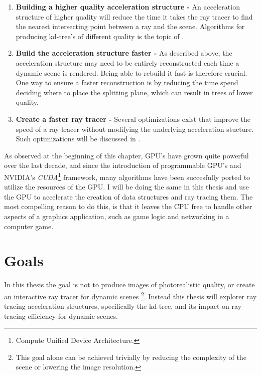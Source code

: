 \begin{enumerate}
  \item \textbf{Building a higher quality acceleration structure -} An
    acceleration structure of higher quality will reduce the time it takes the
    ray tracer to find the nearest intersecting point between a ray and the
    scene. Algorithms for producing kd-tree's of different quality is the topic
    of .
  \item \textbf{Build the acceleration structure faster -} As described above,
    the acceleration structure may need to be entirely reconstructed each time a
    dynamic scene is rendered. Being able to rebuild it fast is therefore
    crucial. One way to ensure a faster reconstruction is by reducing the time
    spend deciding where to place the splitting plane, which can result in trees
    of lower quality.
  \item \textbf{Create a faster ray tracer -} Several optimizations exist that
    improve the speed of a ray tracer without modifying the underlying
    acceleration stucture. Such optimizations will be discussed in
    .
\end{enumerate}



As observed at the beginning of this chapter, GPU's have grown quite powerful
over the last decade, and since the introduction of programmable GPU's and
NVIDIA's \textit{CUDA}\footnote{Compute Unified Device Architecture.}
framework, many algorithms have been succesfully ported to utilize the resources
of the GPU. I will be doing the same in this thesis and use the GPU to
accelerate the creation of data structures and ray tracing them. The most
compelling reason to do this, is that it leaves the CPU free to handle other
aspects of a graphics application, such as game logic and networking in a
computer game. 




\section{Goals}

In this thesis the goal is not to produce images of photorealistic quality, or
create an interactive ray tracer for dynamic scenes \footnote{This goal alone
  can be achieved trivially by reducing the complexity of the scene or lowering
  the image resolution.}. Instead this thesis will explorer ray tracing
acceleration structures, specifically the kd-tree, and its impact on ray tracing
efficiency for dynamic scenes.


